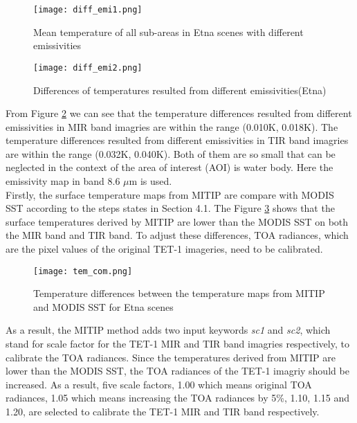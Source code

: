 \begin{figure}[!htbp]
\centering\texttt{[image: diff\_emi1.png]}
\caption{Mean temperature of all sub-areas in Etna scenes with different emissivities}
\label{fig:tem_diff_emi1}
\end{figure}

\begin{figure}[!htbp]
\centering\texttt{[image: diff\_emi2.png]}
\caption{Differences of temperatures resulted from different emissivities(Etna)}
\label{fig:tem_diff_emi2}
\end{figure}

\noindent From Figure \ref{fig:tem_diff_emi2} we can see that the temperature differences resulted from different emissivities in MIR band imagries are within the range (0.010K, 0.018K). The temperature differences resulted from different emissivities in TIR band imagries are within the range (0.032K, 0.040K). Both of them are so small that can be neglected in the context of the area of interest (AOI) is water body. Here the emissivity map in band 8.6 $\mu$m is used.\\

\noindent Firstly, the surface temperature maps from MITIP are compare with MODIS SST according to the steps states in Section 4.1. The Figure \ref{fig:tem_com} shows that the surface temperatures derived by MITIP are lower than the MODIS SST on both the MIR band and TIR band. To adjust these differences, TOA radiances, which are the pixel values of the original TET-1 imageries, need to be calibrated.\\

\begin{figure}[!htbp]
\centering\texttt{[image: tem\_com.png]}
\caption{Temperature differences between the temperature maps from MITIP and MODIS SST for Etna scenes}
\label{fig:tem_com}
\end{figure}

\noindent As a result, the MITIP method adds two input keywords \emph{sc1} and \emph{sc2}, which stand for scale factor for the TET-1 MIR and TIR band imagries respectively, to calibrate the TOA radiances. Since the temperatures derived from MITIP are lower than the MODIS SST, the TOA radiances of the TET-1 imagriy should be increased. As a result, five scale factors, 1.00 which means original TOA radiances, 1.05 which means increasing the TOA radiances by 5\%, 1.10, 1.15 and 1.20, are selected to calibrate the TET-1 MIR and TIR band respectively.\\

